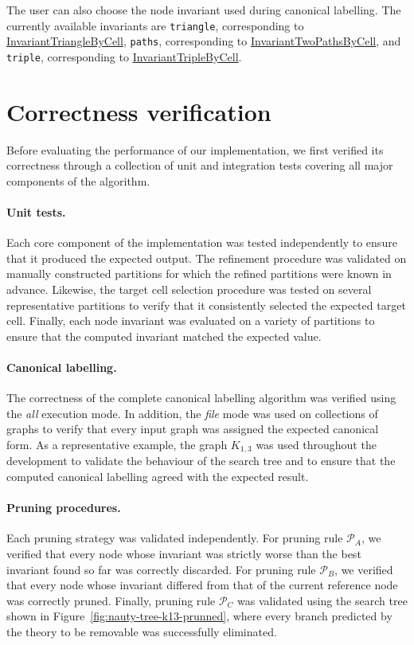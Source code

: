 The user can also choose the node invariant used during canonical labelling. The currently available invariants are \texttt{triangle}, corresponding to \hyperref[algo:invariant_triangle_by_cell]{InvariantTriangleByCell}, \texttt{paths}, corresponding to \hyperref[algo:invariant_two_paths_by_cell]{InvariantTwoPathsByCell}, and \texttt{triple}, corresponding to \hyperref[algo:invariant_cell_triples_by_cell]{InvariantTripleByCell}.



\section{Correctness verification}

Before evaluating the performance of our implementation, we first verified its correctness through a collection of unit and integration tests covering all major components of the algorithm.

\paragraph{Unit tests.}
Each core component of the implementation was tested independently to ensure that it produced the expected output. The refinement procedure was validated on manually constructed partitions for which the refined partitions were known in advance. Likewise, the target cell selection procedure was tested on several representative partitions to verify that it consistently selected the expected target cell. Finally, each node invariant was evaluated on a variety of partitions to ensure that the computed invariant matched the expected value.

\paragraph{Canonical labelling.}
The correctness of the complete canonical labelling algorithm was verified using the \textit{all} execution mode. In addition, the \textit{file} mode was used on collections of graphs to verify that every input graph was assigned the expected canonical form. As a representative example, the graph $K_{1,3}$ was used throughout the development to validate the behaviour of the search tree and to ensure that the computed canonical labelling agreed with the expected result.

\paragraph{Pruning procedures.}
Each pruning strategy was validated independently. For pruning rule $\mathcal{P}_A$, we verified that every node whose invariant was strictly worse than the best invariant found so far was correctly discarded. For pruning rule $\mathcal{P}_B$, we verified that every node whose invariant differed from that of the current reference node was correctly pruned. Finally, pruning rule $\mathcal{P}_C$ was validated using the search tree shown in Figure~\ref{fig:nauty-tree-k13-prunned}, where every branch predicted by the theory to be removable was successfully eliminated.

